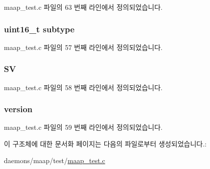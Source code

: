 maap\+\_\+test.\+c 파일의 63 번째 라인에서 정의되었습니다.

\subsubsection[{\texorpdfstring{subtype}{subtype}}]{\setlength{\rightskip}{0pt plus 5cm}uint16\+\_\+t subtype}\hypertarget{structmaap__packet_ac5d9ab8403fb9ca24facc32b821dd53b}{}\label{structmaap__packet_ac5d9ab8403fb9ca24facc32b821dd53b}


maap\+\_\+test.\+c 파일의 57 번째 라인에서 정의되었습니다.

\subsubsection[{\texorpdfstring{SV}{SV}}]{ SV}\hypertarget{structmaap__packet_a86f6b56adf7c3c38c254b7f71dce6a6c}{}\label{structmaap__packet_a86f6b56adf7c3c38c254b7f71dce6a6c}


maap\+\_\+test.\+c 파일의 58 번째 라인에서 정의되었습니다.

\subsubsection[{\texorpdfstring{version}{version}}]{ version}\hypertarget{structmaap__packet_ab22abc2906422da61885ac6c8e6a1a59}{}\label{structmaap__packet_ab22abc2906422da61885ac6c8e6a1a59}


maap\+\_\+test.\+c 파일의 59 번째 라인에서 정의되었습니다.



이 구조체에 대한 문서화 페이지는 다음의 파일로부터 생성되었습니다.\+:\begin{DoxyCompactItemize}
\item 
daemons/maap/test/\hyperlink{maap__test_8c}{maap\+\_\+test.\+c}\end{DoxyCompactItemize}
